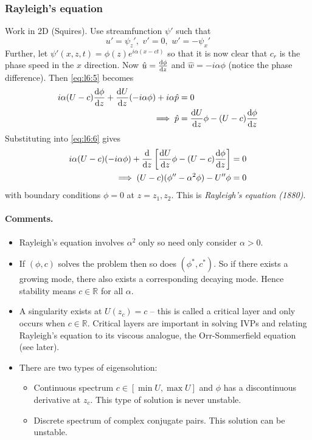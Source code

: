\documentclass{jknotes}
\begin{document}
\subsubsection{Rayleigh's equation}
Work in 2D (Squires). Use streamfunction $\psi'$ such that
\begin{equation}
	u' = \psi_z', \,\,v' = 0, \,\,w' = -\psi_x'
\end{equation}
Further, let $\psi'(x,z,t) = \phi(z)e^{i\alpha(x-ct)}$ so that it is  now
clear that $c_r$ is the phase speed in the $x$ direction. Now $\hat{u} =
\frac{\diffd \phi}{\diffd z}$ and $\hat{w} = -i\alpha \phi$ (notice the phase
difference). Then \eqref{eq:l6:5} becomes
\begin{align}
	i\alpha(U-c)\frac{\diffd \phi}{\diffd z} + \frac{\diffd U}{\diffd
	z}(-i\alpha \phi) + i\alpha \hat{p} &= 0\\
	\implies \hat{p}&= \frac{\diffd U}{\diffd z}\phi - (U-c)\frac{\diffd
	\phi}{\diffd z}
\end{align}
Substituting into \eqref{eq:l6:6} gives
\begin{align}
	i\alpha (U-c)(-i\alpha \phi) + \frac{\diffd}{\diffd z}\left[ \frac{\diffd
	U}{\diffd z}\phi - (U-c)\frac{\diffd \phi}{\diffd z}\right] &= 0 \\
	\implies (U-c)(\phi'' - \alpha^2 \phi) - U'' \phi &=0 \label{eq:rayleigh}
\end{align}
with boundary conditions $\phi = 0$ at $z=z_1, z_2$. This is \emph{Rayleigh's
equation (1880)}.
\paragraph{Comments.}
\begin{itemize}
	\item Rayleigh's equation involves $\alpha^2$ only so need only consider
		$\alpha > 0$.
	\item If $(\phi,c)$ solves the problem then so does $(\phi^*, c^*)$. So if
		there exists a growing mode, there  also exists a corresponding
		decaying mode. Hence stability means $c \in \mathbb{R}$ for all
		$\alpha$.
	\item A singularity  exists at $U(z_c) = c$ -- this is called a critical
		layer and only occurs when $c \in \mathbb{R}$. Critical layers are
		important in solving IVPs and relating Rayleigh's equation to its
		viscous analogue, the Orr-Sommerfield equation (see later).
	\item There are two types of eigensolution:
		\begin{itemize}
			\item Continuous  spectrum $c \in \left[ \min U, \max
				U\right]$ and $\phi$ has a discontinuous derivative at $z_c$.
				This type of solution is never unstable.
			\item Discrete spectrum of complex conjugate pairs. This solution
				can be unstable.
		\end{itemize}
\end{itemize}
\end{document}
